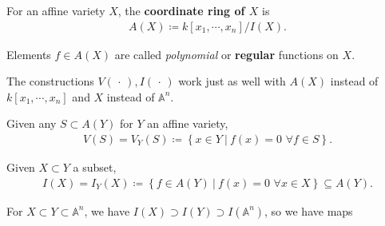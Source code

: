\begin{definition}

For an affine variety \(X\), the \textbf{coordinate ring of \(X\)} is
\begin{align*}  
A(X) \coloneqq k[x_1, \cdots, x_n]/ I(X)
.\end{align*}

Elements \(f\in A(X)\) are called \emph{polynomial} or \textbf{regular}
functions on \(X\).

\end{definition}

\begin{observation}

The constructions \(V({\,\cdot\,}), I({\,\cdot\,})\) work just as well
with \(A(X)\) instead of \(k[x_1, \cdots, x_{n}]\) and \(X\) instead of
\({\mathbb{A}}^n\).

Given any \(S\subset A(Y)\) for \(Y\) an affine variety,
\begin{align*}  
V(S) = V_Y(S) \coloneqq\left\{{x\in Y {~\mathrel{\Big|}~}f(x) = 0\,\,\forall f\in S}\right\}
.\end{align*}

Given \(X\subset Y\) a subset,
\begin{align*}  
I(X) = I_Y(X) \coloneqq\left\{{f\in A(Y) {~\mathrel{\Big|}~}f(x) = 0\,\,\forall x\in X}\right\} \subseteq A(Y)
.\end{align*}

\end{observation}

\begin{example}

For \(X\subset Y \subset {\mathbb{A}}^n\), we have
\(I(X) \supset I(Y) \supset I({\mathbb{A}}^n)\), so we have maps

\begin{center}
\end{center}

\end{example}

